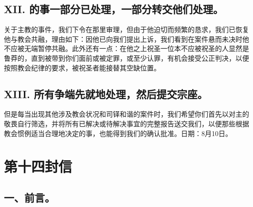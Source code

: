 
\subsection{XII. 的事一部分已处理，一部分转交他们处理。}

关于主教的事件，我们下令在那里审理，但由于他迫切而频繁的恳求，我们已恢复他与教会共融，理由如下：因他已向我们提出上诉，我们看到在案件悬而未决时他不应被无端暂停共融。此外还有一点：在他之上祝圣一位本不应被祝圣的人显然是鲁莽的，直到被带到你们面前或被定罪，或至少认罪，有机会接受公正判决，以便按照教会纪律的要求，被祝圣者能接替其空缺位置。\par


\subsection{XIII. 所有争端先就地处理，然后提交宗座。}

但是每当出现其他涉及教会状况和司铎和谐的案件时，我们希望你们首先以对主的敬畏自行筛选，并将所有已解决或待解决事宜的完整报告送交我们，以便那些根据教会惯例适当合理地决定的事，也能得到我们的确认批准。日期：8月10日。\par



\section{第十四封信}

\par


\subsection{一、前言。}

